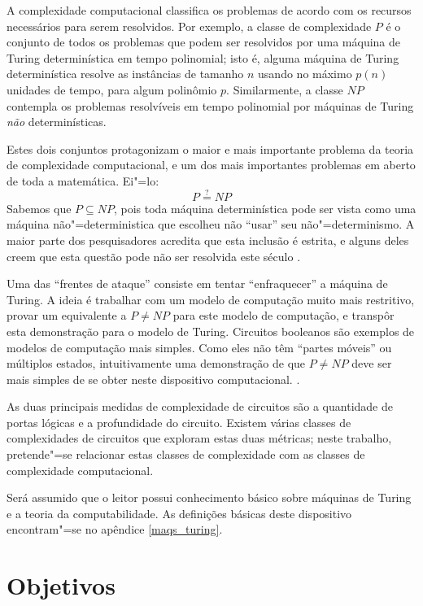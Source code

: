 A complexidade computacional classifica os problemas
de acordo com os recursos necessários para serem resolvidos.
Por exemplo,
a classe de complexidade $P$
é o conjunto de todos os problemas que podem ser resolvidos
por uma máquina de Turing determinística
em tempo polinomial;
isto é,
alguma máquina de Turing determinística
resolve as instâncias de tamanho $n$
usando no máximo $p(n)$ unidades de tempo,
para algum polinômio $p$.
Similarmente,
a classe $NP$
contempla os problemas resolvíveis em tempo polinomial
por máquinas de Turing \emph{não} determinísticas.

Estes dois conjuntos protagonizam
o maior e mais importante problema da teoria de complexidade computacional,
e um dos mais importantes problemas em aberto de toda a matemática.
Ei"=lo:
\begin{displaymath}
    P \stackrel?= NP
\end{displaymath}
\cite[p. 270]{Sipser2006}
Sabemos que $P \subseteq NP$,
pois toda máquina determinística pode ser vista como
uma máquina não"=deterministica que escolheu não ``usar''
seu não"=determinismo.
A maior parte dos pesquisadores acredita que
esta inclusão é estrita,
e alguns deles creem que esta questão
pode não ser resolvida este século
\cite[p. 2]{Gasarch2012}.

Uma das ``frentes de ataque''
consiste em tentar ``enfraquecer''
a máquina de Turing.
A ideia é trabalhar com um modelo de computação muito mais restritivo,
provar um equivalente a $P \neq NP$
para este modelo de computação,
e transpôr esta demonstração para o modelo de Turing.
Circuitos booleanos
são exemplos de modelos de computação mais simples.
Como eles não têm ``partes móveis''
ou múltiplos estados,
intuitivamente uma demonstração de que $P \neq NP$
deve ser mais simples de se obter
neste dispositivo computacional. \cite{Hastad1987}.

As duas principais medidas
de complexidade de circuitos
são a quantidade de portas lógicas
e a profundidade do circuito.
Existem várias classes de complexidades de circuitos
que exploram estas duas métricas;
neste trabalho,
pretende"=se relacionar estas classes de complexidade
com as classes de complexidade computacional.

Será assumido que o leitor possui conhecimento básico
sobre máquinas de Turing e a teoria da computabilidade.
As definições básicas deste dispositivo
encontram"=se no apêndice \ref{maqs_turing}.

\section{Objetivos}

